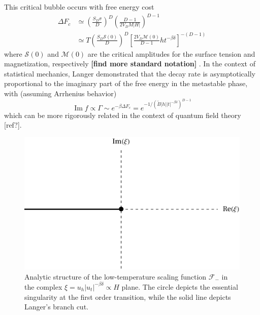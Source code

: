 \documentclass[
  aps,
  pre,
  preprint,
  longbibliography,
  floatfix
]{revtex4-2}
\begin{document}
This critical bubble occurs with free energy cost
\begin{equation}
  \begin{aligned}
    \Delta F_c
      &\simeq\left(\frac{S_D\sigma}D\right)^D\left(\frac{D-1}{2V_DM|H|}\right)^{D-1} \\
      &\simeq T\left(\frac{S_D\mathcal S(0)}D\right)^D\left[\frac{2V_D\mathcal M(0)}{D-1}ht^{-\beta\delta}\right]^{-(D-1)}
  \end{aligned}
\end{equation}
where $\mathcal S(0)$ and $\mathcal M(0)$ are the critical amplitudes for the
surface tension and magnetization, respectively \textbf{[find more standard
notation]} \cite{Kent-Dobias_2020_Novel}.
In the context of statistical mechanics, Langer demonstrated that the decay rate is asymptotically proportional to the imaginary part of the free energy in the metastable phase, with (assuming Arrhenius behavior)
\begin{equation}
  \operatorname{Im}f\propto\Gamma\sim e^{-\beta\Delta F_c}=e^{-1/(\tilde B|h||t|^{-\beta\delta})^{D-1}}
\end{equation}
which can be more rigorously related in the context of quantum field theory [ref?].

\begin{figure}
  \includegraphics{figs/F_lower_singularities.pdf}
  \caption{
    Analytic structure of the low-temperature scaling function $\mathcal F_-$
    in the complex $\xi=u_h|u_t|^{-\beta\delta}\propto H$ plane. The circle
    depicts the essential singularity at the first order transition, while the
    solid line depicts Langer's branch cut.
  } \label{fig:lower.singularities}
\end{figure}
  
\end{document}
